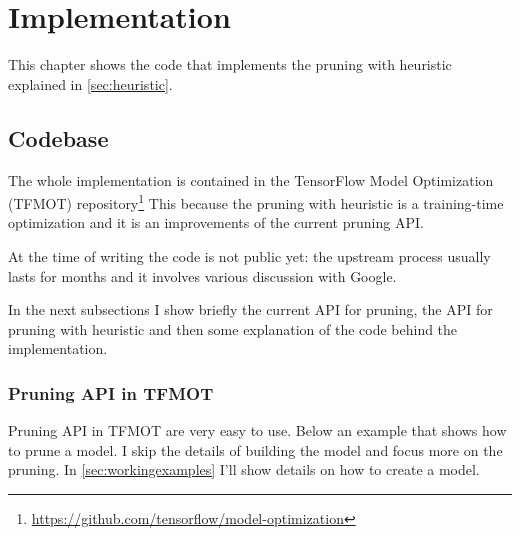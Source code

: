 \chapter{Implementation}\label{ch:implementation}
This chapter shows the code that implements the pruning with heuristic
explained in \autoref{sec:heuristic}.

\section{Codebase}
The whole implementation is contained in the TensorFlow Model Optimization
(TFMOT)
repository\footnote{\url{https://github.com/tensorflow/model-optimization}}
This because the pruning with heuristic is a training-time optimization and it
is an improvements of the current pruning API\@.

At the time of writing the code is not public yet: the upstream process usually
lasts for months and it involves various discussion with Google.

In the next subsections I show briefly the current API for pruning, the API for
pruning with heuristic and then some explanation of the code behind the
implementation.

\subsection{Pruning API in TFMOT}
Pruning API in TFMOT are very easy to use. Below an example that shows how to
prune a model. I skip the details of building the model and focus more on the
pruning. In \autoref{sec:workingexamples} I'll show details on how to create a
model.


